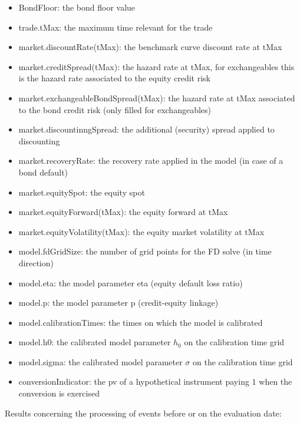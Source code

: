 \begin{itemize}
\item BondFloor: the bond floor value
\item trade.tMax: the maximum time relevant for the trade
\item market.discountRate(tMax): the benchmark curve discount rate at tMax
\item market.creditSpread(tMax): the hazard rate at tMax, for exchangeables this is the hazard rate associated to the
  equity credit risk
\item market.exchangeableBondSpread(tMax): the hazard rate at tMax associated to the bond credit risk (only filled for
  exchangeables)
\item market.discountinngSpread: the additional (security) spread applied to discounting
\item market.recoveryRate: the recovery rate applied in the model (in case of a bond default)
\item market.equitySpot: the equity spot
\item market.equityForward(tMax): the equity forward at tMax
\item market.equityVolatility(tMax): the equity market volatility at tMax
\item model.fdGridSize: the number of grid points for the FD solve (in time direction)
\item model.eta: the model parameter eta (equity default loss ratio)
\item model.p: the model parameter p (credit-equity linkage)
\item model.calibrationTimes: the times on which the model is calibrated
\item model.h0: the calibrated model parameter $h_0$ on the calibration time grid
\item model.sigma: the calibrated model parameter $\sigma$ on the calibration time grid
\item conversionIndicator: the pv of a hypothetical instrument paying $1$ when the conversion is exercised
\end{itemize}

Results concerning the processing of events before or on the evaluation date:

